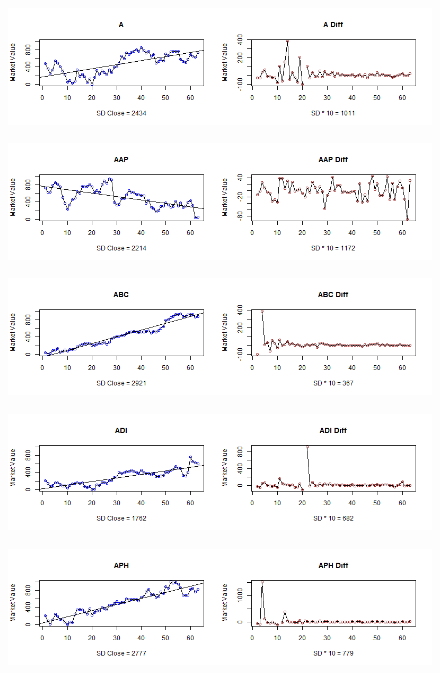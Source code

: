 \begin{figure}[!h]
	\includegraphics[scale=0.5]{images/appendixC/A_FRST.png}
\end{figure}

\begin{figure}[!h]
	\includegraphics[scale=0.5]{images/appendixC/AAP_FRST.png}
\end{figure}


\begin{figure}[!h]
	\includegraphics[scale=0.5]{images/appendixC/ABC_FRST.png}
\end{figure}

\begin{figure}[!h]
	\includegraphics[scale=0.5]{images/appendixC/ADI_FRST.png}
\end{figure}

\begin{figure}[!h]
	\includegraphics[scale=0.5]{images/appendixC/APH_FRST.png}
\end{figure}

